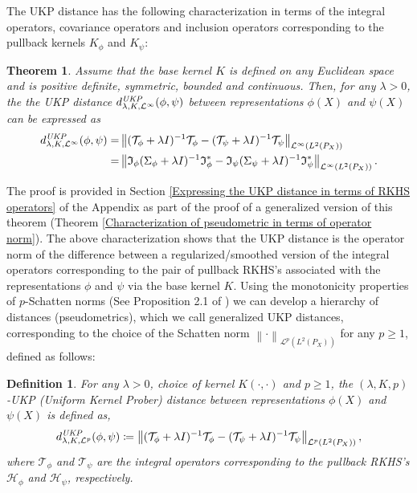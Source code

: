 \documentclass{article} %
\newcommand{\I}{\mathfrak{I}}
\newcommand{\repone}{\phi}
\newcommand{\reptwo}{\psi}
\newcommand{\Hone}{\mathcal{H}_{\phi}}
\newcommand{\Htwo}{\mathcal{H}_{\psi}}
\newcommand{\Sone}{\Sigma_{\repone}}
\newcommand{\Stwo}{\Sigma_{\reptwo}}
\newcommand{\Sonelambdainv}{(\Sone+\lambda I)^{-1}}
\newcommand{\Stwolambdainv}{(\Stwo+\lambda I)^{-1}}
\newcommand{\Tone}{\mathcal{T}_{\repone}}
\newcommand{\Ttwo}{\mathcal{T}_{\reptwo}}
\newcommand{\Tonelambdainv}{(\Tone+\lambda I)^{-1}}
\newcommand{\Ttwolambdainv}{(\Ttwo+\lambda I)^{-1}}
\newcommand{\Irepone}{\I_{\repone}}
\newcommand{\Ireptwo}{\I_{\reptwo}}
\newcommand{\Ireponead}{\Irepone^{*}}
\newcommand{\Ireptwoad}{\Ireptwo^{*}}
\newcommand{\norm}[1]{\left\|#1\right\|}
\newcommand{\LPtwo}{L^{2}(P_{X})}
\newcommand{\optwo}{\mathcal{L}^{\infty}(\LPtwo)}
\newcommand{\Lptwo}{\mathcal{L}^{p}(\LPtwo)}
\newcommand{\metricstname}{UKP }
\newcommand{\metricfullname}{Uniform Kernel Prober}
\newcommand{\dop}{d_{\lambda,K,\mathcal{L}^{\infty}}^{\emph{\metricstname}}}
\newcommand{\dLp}{d_{\lambda,K,\mathcal{L}^{p}}^{\emph{\metricstname}}}
\theoremstyle{plain}
\newcounter{theoremno}
\newcounter{definitionno}
\newtheorem{theorem}[theoremno]{Theorem}
\newtheorem{definition}[definitionno]{Definition}
\begin{document}
The \metricstname distance has the following characterization in terms of the integral operators, covariance operators and inclusion operators corresponding to the pullback kernels $K_{\repone}$ and $K_{\reptwo}$:
\begin{theorem}\label{Characterization of pseudometric in terms of operator norm short version}
Assume that the base kernel $K$ is defined on any Euclidean space and is positive definite, symmetric, bounded and continuous. Then, for any $\lambda>0$, the the UKP distance $ \dop (\repone,\reptwo)$ between representations $\repone(X)$ and $\reptwo(X)$ can be expressed as 
\[
\begin{aligned}
     \dop(\repone,\reptwo) =& \norm{\Tonelambdainv \Tone - \Ttwolambdainv \Ttwo}_{\optwo}\\
     =& \norm{ \Irepone \Sonelambdainv \Ireponead -  \Ireptwo \Stwolambdainv \Ireptwoad }_{\optwo}.
\end{aligned}
\]
\end{theorem}

The proof is provided in Section \ref{Expressing the UKP distance in terms of RKHS operators} of the Appendix as part of the proof of a generalized version of this theorem (Theorem \ref{Characterization of pseudometric in terms of operator norm}). The above characterization shows that the \metricstname distance is the operator norm of the difference between a regularized/smoothed version of the integral operators corresponding to the pair of pullback RKHS's associated with the representations $\repone$ and $\reptwo$ via the base kernel $K$. 
Using the monotonicity properties of $p$-Schatten norms (See Proposition 2.1 of \citet{pfeiffer2021stability}) we can develop a hierarchy of distances (pseudometrics), which we call generalized \metricstname distances, corresponding to the choice of the Schatten norm $\norm{\cdot}_{\Lptwo}$ for any $ p \geq 1$, defined as follows:
\begin{definition}\label{Definition of pseudometric Lp norm}
    For any $\lambda>0$, choice of kernel $K(\cdot,\cdot)$ and $p \geq 1$, the $(\lambda,K,p)$-\metricstname (\metricfullname) distance between representations $\repone(X)$ and $\reptwo(X)$ is defined as, 
    \[
    \dLp(\repone,\reptwo) \coloneq \norm{\Tonelambdainv \Tone - \Ttwolambdainv \Ttwo}_{\Lptwo},
    \]
    where $\Tone$ and $\Ttwo$ are the integral operators corresponding to the pullback RKHS's $\Hone$ and $\Htwo$, respectively.
\end{definition}
\end{document}
